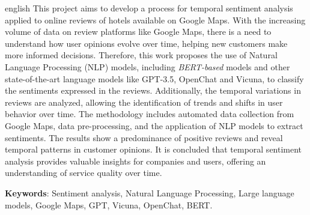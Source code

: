 \begin{resumo}[Abstract]
 \begin{otherlanguage*}{english}
    This project aims to develop a process for temporal sentiment analysis applied to online reviews of hotels available on Google Maps. With the increasing volume of data on review platforms like Google Maps, there is a need to understand how user opinions evolve over time, helping new customers make more informed decisions. Therefore, this work proposes the use of Natural Language Processing (NLP) models, including \textit{BERT-based} models and other state-of-the-art language models like GPT-3.5, OpenChat and Vicuna, to classify the sentiments expressed in the reviews. Additionally, the temporal variations in reviews are analyzed, allowing the identification of trends and shifts in user behavior over time. The methodology includes automated data collection from Google Maps, data pre-processing, and the application of NLP models to extract sentiments. The results show a predominance of positive reviews and reveal temporal patterns in customer opinions. It is concluded that temporal sentiment analysis provides valuable insights for companies and users, offering an understanding of service quality over time.

   \vspace{\onelineskip}
 
   \noindent 
   \textbf{Keywords}: Sentiment analysis, Natural Language Processing, Large language models, Google Maps, GPT, Vicuna, OpenChat, BERT.
 \end{otherlanguage*}
\end{resumo}